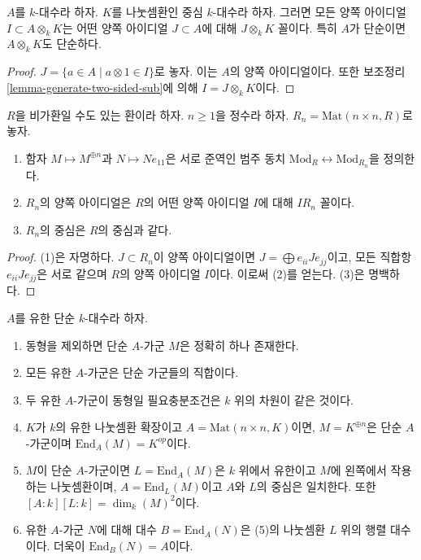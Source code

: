 \begin{lemma}
\label{lemma-generate-two-sided-ideal}
$A$를 $k$-대수라 하자. $K$를 나눗셈환인 중심 $k$-대수라 하자.
그러면 모든 양쪽 아이디얼 $I \subset A \otimes_k K$는 어떤
양쪽 아이디얼 $J \subset A$에 대해 $J \otimes_k K$ 꼴이다.
특히 $A$가 단순이면 $A \otimes_k K$도 단순하다.
\end{lemma}

\begin{proof}
$J = \{a \in A \mid a \otimes 1 \in I\}$로 놓자. 이는 $A$의 양쪽
아이디얼이다. 또한 보조정리 \ref{lemma-generate-two-sided-sub}에 의해
$I = J \otimes_k K$이다.
\end{proof}

\begin{lemma}
\label{lemma-matrix-algebras}
$R$을 비가환일 수도 있는 환이라 하자. $n \geq 1$을 정수라 하자.
$R_n = \text{Mat}(n \times n, R)$로 놓자.
\begin{enumerate}
\item 함자 $M \mapsto M^{\oplus n}$과 $N \mapsto Ne_{11}$은 서로 준역인
범주 동치 $\text{Mod}_R \leftrightarrow \text{Mod}_{R_n}$을 정의한다.
\item $R_n$의 양쪽 아이디얼은 $R$의 어떤 양쪽 아이디얼 $I$에 대해
$IR_n$ 꼴이다.
\item $R_n$의 중심은 $R$의 중심과 같다.
\end{enumerate}
\end{lemma}

\begin{proof}
(1)은 자명하다. $J \subset R_n$이 양쪽 아이디얼이면
$J = \bigoplus e_{ii}Je_{jj}$이고, 모든 직합항 $e_{ii}Je_{jj}$은 서로 같으며
$R$의 양쪽 아이디얼 $I$이다. 이로써 (2)를 얻는다. (3)은 명백하다.
\end{proof}

\begin{lemma}
\label{lemma-simple-module-unique}
$A$를 유한 단순 $k$-대수라 하자.
\begin{enumerate}
\item 동형을 제외하면 단순 $A$-가군 $M$은 정확히 하나 존재한다.
\item 모든 유한 $A$-가군은 단순 가군들의 직합이다.
\item 두 유한 $A$-가군이 동형일 필요충분조건은 $k$ 위의 차원이 같은 것이다.
\item $K$가 $k$의 유한 나눗셈환 확장이고
$A = \text{Mat}(n \times n, K)$이면, $M = K^{\oplus n}$은 단순
$A$-가군이며 $\text{End}_A(M) = K^{op}$이다.
\item $M$이 단순 $A$-가군이면 $L = \text{End}_A(M)$은 $k$ 위에서
유한이고 $M$에 왼쪽에서 작용하는 나눗셈환이며,
$A = \text{End}_L(M)$이고 $A$와 $L$의 중심은 일치한다.
또한 $[A : k] [L : k] = \dim_k(M)^2$이다.
\item 유한 $A$-가군 $N$에 대해 대수 $B = \text{End}_A(N)$은 (5)의
나눗셈환 $L$ 위의 행렬 대수이다. 더욱이 $\text{End}_B(N) = A$이다.
\end{enumerate}
\end{lemma}

